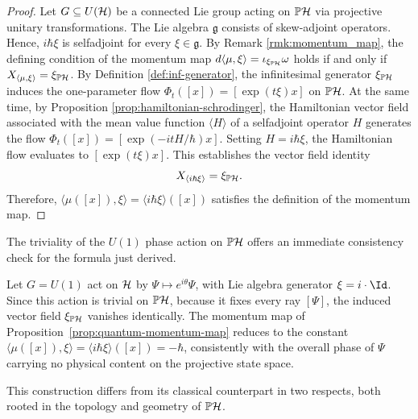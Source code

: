 \begin{proof}
	Let $G \subseteq U(\H)$ be a connected Lie group acting on $\PH$ via projective unitary transformations. The Lie algebra $\mathfrak{g}$ consists of skew-adjoint operators. Hence, $i\hbar\xi$ is selfadjoint for every $\xi \in \mathfrak{g}$.
	By Remark \ref{rmk:momentum_map}, the defining condition of the momentum map $d\langle \mu, \xi \rangle = \iota_{\xi_{\PH}}\omega$ holds if and only if $X_{\langle \mu, \xi \rangle} = \xi_{\PH}$. By Definition \ref{def:inf-generator}, the infinitesimal generator $\xi_{\PH}$ induces the one-parameter flow $\Phi_t([x]) = [\exp(t\xi)x]$ on $\PH$. At the same time, by Proposition \ref{prop:hamiltonian-schrodinger}, the Hamiltonian vector field associated with the mean value function $\langle H \rangle$ of a selfadjoint operator $H$ generates the flow $\Phi_t([x]) = [\exp(-itH/\hbar)x]$.
	Setting $H = i\hbar\xi$, the Hamiltonian flow evaluates  to $[\exp(t\xi)x]$. This establishes the vector field identity $$X_{\langle i\hbar\xi \rangle} = \xi_{\PH}.$$ Therefore, $\langle \mu([x]), \xi \rangle = \langle i\hbar\xi \rangle([x])$ satisfies the definition of the momentum map.
\end{proof}

The triviality of the $U(1)$ phase action on $\PH$ offers an immediate consistency check for the formula just derived.

\begin{example}
	Let $G=U(1)$ act on $\H$ by $\Psi\mapsto e^{i\theta}\Psi$, with Lie algebra generator $\xi=i\cdot\Id$. Since this action is trivial on $\PH$, because it fixes every ray $[\Psi]$, the induced vector field $\xi_{\PH}$ vanishes identically. The momentum map of Proposition~\ref{prop:quantum-momentum-map} reduces to the constant $\langle\mu([x]),\xi\rangle=\langle i\hbar\xi\rangle([x])=-\hbar$, consistently with the overall phase of $\Psi$ carrying no physical content on the projective state space.
\end{example}

This construction differs from its classical counterpart in two respects, both rooted in the topology and geometry of $\PH$.

